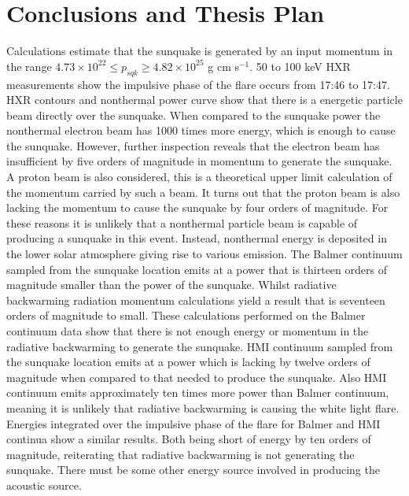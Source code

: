 \section{Conclusions and Thesis Plan}
Calculations estimate that the sunquake is generated by an input momentum in the range $4.73{\times}10^{22} \leq p_{sqk} \geq 4.82{\times}10^{25}$ g cm s$^{-1}$. 50 to 100 keV HXR measurements show the impulsive phase of the flare occurs from 17:46 to 17:47. HXR contours and nonthermal power curve show that there is a energetic particle beam directly over the sunquake. When compared to the sunquake power the nonthermal electron beam has 1000 times more energy, which is enough to cause the sunquake. However, further inspection reveals that the electron beam has insufficient by five orders of magnitude in momentum to generate the sunquake. A proton beam is also considered, this is a theoretical upper limit calculation of the momentum carried by such a beam. It turns out that the proton beam is also lacking the momentum to cause the sunquake by four orders of magnitude. For these reasons it is unlikely that a nonthermal particle beam is capable of producing a sunquake in this event. Instead, nonthermal energy is deposited in the lower solar atmosphere giving rise to various emission. The Balmer continuum sampled from the sunquake location emits at a power that is thirteen orders of magnitude smaller than the power of the sunquake. Whilst radiative backwarming radiation momentum calculations yield a result that is seventeen orders of magnitude to small. These calculations performed on the Balmer continuum data show that there is not enough energy or momentum in the radiative backwarming to generate the sunquake. HMI continuum sampled from the sunquake location emits at a power which is lacking by twelve orders of magnitude when compared to that needed to produce the sunquake. Also HMI continuum emits approximately ten times more power than Balmer continuum, meaning it is unlikely that radiative backwarming is causing the white light flare. Energies integrated over the impulsive phase of the flare for Balmer and HMI continua show a similar results. Both being short of energy by ten orders of magnitude, reiterating that radiative backwarming is not generating the sunquake. There must be some other energy source involved in producing the acoustic source. 

